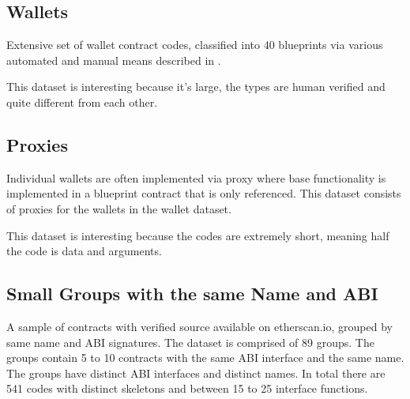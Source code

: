 \documentclass[../main.tex]{subfiles}
\begin{document}
\subsection{Wallets}
Extensive set of wallet contract codes, classified into 40 blueprints via various automated and manual means described in .

This dataset is interesting because it's large, the types are human verified and quite different from each other.

\subsection{Proxies}
Individual wallets are often implemented via proxy where base functionality is implemented in a blueprint contract that is only referenced. This dataset consists of proxies for the wallets in the wallet dataset.

This dataset is interesting because the codes are extremely short, meaning half the code is data and arguments.

\subsection{Small Groups with the same Name and ABI}
A sample of contracts with verified source available on etherscan.io, grouped by same name and ABI signatures. The dataset is comprised of 89 groups. The groups contain 5 to 10 contracts with the same ABI interface and the same name. The groups have distinct ABI interfaces and distinct names.
In total there are 541 codes with distinct skeletons and between 15 to 25 interface functions.
\end{document}
